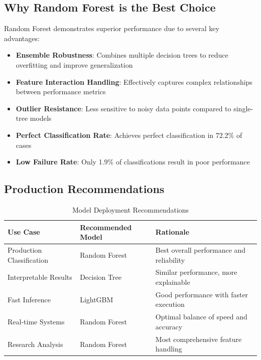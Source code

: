 \documentclass[12pt]{article}
\begin{document}
\subsection{Why Random Forest is the Best Choice}

Random Forest demonstrates superior performance due to several key advantages:

\begin{itemize}
    \item \textbf{Ensemble Robustness}: Combines multiple decision trees to reduce overfitting and improve generalization
    \item \textbf{Feature Interaction Handling}: Effectively captures complex relationships between performance metrics
    \item \textbf{Outlier Resistance}: Less sensitive to noisy data points compared to single-tree models
    \item \textbf{Perfect Classification Rate}: Achieves perfect classification in 72.2\% of cases
    \item \textbf{Low Failure Rate}: Only 1.9\% of classifications result in poor performance
\end{itemize}

\subsection{Production Recommendations}

\begin{table}[h!]
\centering
\caption{Model Deployment Recommendations}
\label{tab:deployment_recommendations}
\begin{tabular}{|l|l|l|}
\hline
\textbf{Use Case} & \textbf{Recommended Model} & \textbf{Rationale} \\
\hline
Production Classification & Random Forest & Best overall performance and reliability \\
\hline
Interpretable Results & Decision Tree & Similar performance, more explainable \\
\hline
Fast Inference & LightGBM & Good performance with faster execution \\
\hline
Real-time Systems & Random Forest & Optimal balance of speed and accuracy \\
\hline
Research Analysis & Random Forest & Most comprehensive feature handling \\
\hline
\end{tabular}
\end{table}
\end{document}
